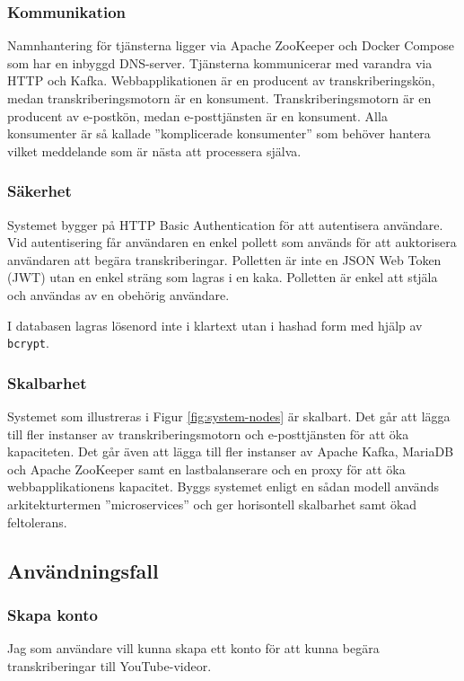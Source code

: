 \subsubsection{Kommunikation}
Namnhantering för tjänsterna ligger via Apache ZooKeeper och Docker Compose
som har en inbyggd DNS-server. Tjänsterna kommunicerar med varandra via HTTP
och Kafka. Webbapplikationen är en producent av transkriberingskön, medan
transkriberingsmotorn är en konsument. Transkriberingsmotorn är en producent
av e-postkön, medan e-posttjänsten är en konsument. Alla konsumenter är så
kallade ''komplicerade konsumenter'' som behöver hantera vilket meddelande som
är nästa att processera själva.

\subsubsection{Säkerhet}
Systemet bygger på HTTP Basic Authentication för att autentisera användare.
Vid autentisering får användaren en enkel pollett som används för att
auktorisera användaren att begära transkriberingar. Polletten är inte en JSON
Web Token (JWT) utan en enkel sträng som lagras i en kaka. Polletten är enkel
att stjäla och användas av en obehörig användare. 

I databasen lagras lösenord inte i klartext utan i hashad form med hjälp av \verb|bcrypt|. 

\subsubsection{Skalbarhet}
Systemet som illustreras i Figur \ref{fig:system-nodes} är skalbart. Det går
att lägga till fler instanser av transkriberingsmotorn och e-posttjänsten för
att öka kapaciteten. Det går även att lägga till fler instanser av Apache
Kafka, MariaDB och Apache ZooKeeper samt en lastbalanserare och en proxy för
att öka webbapplikationens kapacitet. Byggs systemet enligt en sådan modell
används arkitekturtermen ''microservices'' och ger horisontell skalbarhet samt
ökad feltolerans. 

\subsection{Användningsfall}

\subsubsection{Skapa konto}
Jag som användare vill kunna skapa ett konto för att kunna begära
transkriberingar till YouTube-videor.

